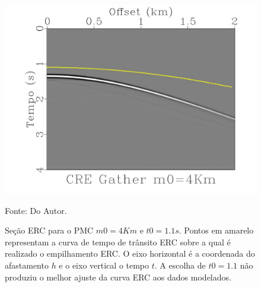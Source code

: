 \begin{figure}
\caption{Seção ERC para o PMC $m0=4Km$ e $t0=1.1s$.
Pontos em amarelo representam a curva de tempo de trânsito ERC sobre a qual
é realizado o empilhamento ERC.
O eixo horizontal é a coordenada do afastamento $h$ e o eixo vertical o tempo
$t$. A escolha de $t0=1.1$ não produziu o melhor ajuste da curva ERC aos dados modelados.}
\begin{center}
\includegraphics[scale=0.3]{images/interpolacaoErro.jpeg}
\vspace{-0.3cm}
\end{center}
\begin{center}
 Fonte: Do Autor.
\end{center}
\label{fig:6.3}
\end{figure}
